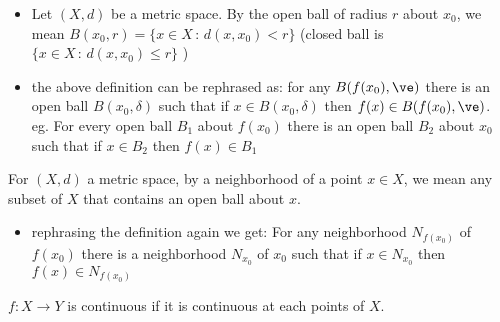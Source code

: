 \begin{itemize}
    \item Let $(X,d)$ be a metric space. By the open ball of radius $r$ about $x_0$, we mean $B(x_0, r) = \{x \in X \, : \, d(x, x_0) <r \}$ (closed ball is $\{x \in X \, : \, d(x, x_0) \le r \}$ )
    \item the above definition can be rephrased as: for any $B(f(x_0), \ve)$ there is an open ball $B(x_0, \delta)$ such that if $x \in B(x_0, \delta)$ then $f(x) \in B(f(x_0), \ve)$. \\
    eg. For every open ball $B_1$ about $f(x_0)$ there is an open ball $B_2$ about $x_0$ such that if $x \in B_2$ then $f(x) \in B_1$ 
\end{itemize}

\begin{definition}
    For $(X,d)$ a metric space, by a neighborhood of a point $x \in X$, we mean any subset of $X$ that contains an open ball about $x$. 
\end{definition}

\begin{itemize}
    \item rephrasing the definition again we get: For any neighborhood $N_{f(x_0)}$ of $f(x_0)$ there is a neighborhood $N_{x_0}$ of $x_0$ such that if $x \in N_{x_0}$ then $f(x) \in N_{f(x_0)}$ 
\end{itemize}

\begin{definition}
    $f: X \to Y$ is continuous if it is continuous at each points of $X$. 
\end{definition}
